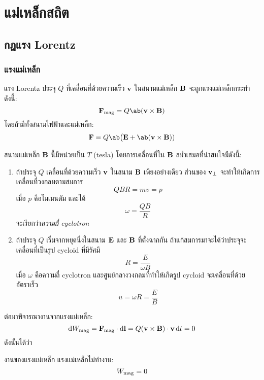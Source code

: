 \chapter{แม่เหล็กสถิต}
\section{กฎแรง Lorentz}
\subsection{แรงแม่เหล็ก}

\begin{lawbox}{แรง Lorentz}
    ประจุ $Q$ ที่เคลื่อนที่ด้วยความเร็ว $\mathbf{v}$ ในสนามแม่เหล็ก $\mathbf{B}$ จะถูกแรงแม่เหล็กกระทำดังนี้:
    \begin{equation}
        \vb{F}_\txt{mag} = Q\ab(\vb{v}\times\vb{B})
    \end{equation}
    โดยถ้ามีทั้งสนามไฟฟ้าและแม่เหล็ก:
    \begin{equation}
        \vb{F} = Q\ab\big(\vb{E} + \ab(\vb{v}\times\vb{B}))\label{lorentz}
    \end{equation}
\end{lawbox}
สนามแม่เหล็ก $\mathbf{B}$ นี้มีหน่วยเป็น $\unit{T}$ (tesla) โดยการเคลื่อนที่ใน $\mathbf{B}$ สม่ำเสมอที่น่าสนใจมีดังนี้:
\begin{enumerate}
    \item ถ้าประจุ $Q$ เคลื่อนที่ด้วยความเร็ว $\mathbf{v}$ ในสนาม $\mathbf{B}$ เพียงอย่างเดียว ส่วนของ $\mathbf{v}_\perp$ จะทำให้เกิดการเคลื่อนที่วงกลมตามสมการ
    \[
    QBR=mv=p
    \]
    เมื่อ $p$ คือโมเมนตัม และได้
    \[
    \omega = \frac{QB}{R}
    \]
    จะเรียกว่า\emph{ความถี่ cyclotron}
    \item ถ้าประจุ $Q$ เริ่มจากหยุดนิ่งในสนาม $\mathbf{E}$ และ $\mathbf{B}$ ที่ตั้งฉากกัน ถ้าแก้สมการมาจะได้ว่าประจุจะเคลื่อนที่เป็นรูป cycloid ที่มีรัศมี
    \[
    R=\frac{E}{\omega B}
    \]
    เมื่อ $\omega$ คือความถี่ cyclotron และศูนย์กลางวงกลมที่ทำให้เกิดรูป cycloid จะเคลื่อนที่ด้วยอัตราเร็ว
    \[
    u=\omega R=\frac{E}{B}
    \]
\end{enumerate}
ต่อมาพิจารณางานจากแรงแม่เหล็ก:
\[
\odif{W}_\txt{mag}=\vb{F}_\txt{mag}\cdot\odif{\vb{l}}=Q(\vb{v}\times\vb{B})\cdot\vb{v}\odif{t}=0
\]
ดังนั้นได้ว่า
\begin{corbox}{งานของแรงแม่เหล็ก}
    แรงแม่เหล็กไม่ทำงาน:
    \begin{equation}
        W_{\mathrm{mag}}=0
    \end{equation}
\end{corbox}

